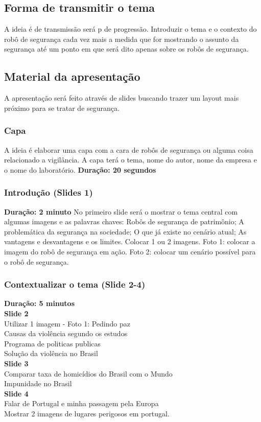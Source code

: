 \documentclass[12pt,a4paper]{article}
\begin{document}
    \subsection{Forma de transmitir o tema}
    A ideia é de transmissão será p de progressão. Introduzir o tema e o contexto do robô de segurança cada vez mais a medida que for mostrando o assunto da segurança até um ponto em que será dito apenas sobre os robôs de segurança. 

    \subsection{Material da apresentação}
    A apresentação será feito através de slides buscando trazer um layout mais próximo para se tratar de segurança.

    \subsubsection{Capa}
    A ideia é elaborar uma capa com a cara de robôs de segurança ou alguma coisa relacionado a vigilância. A capa terá o tema, nome do autor, nome da empresa e o nome do laboratório.
    \textbf{Duração: 20 segundos}

    \subsubsection{Introdução (Slides 1)}
    \textbf{Duração: 2 minuto}
    No primeiro slide será o mostrar o tema central com algumas imagens e as palavras chaves: Robôs de segurança de patrimônio; A problemática da segurança na sociedade;  O que já existe no cenário atual; As vantagens e desvantagens e os limites. Colocar 1 ou 2 imagens. Foto 1: colocar a imagem do robô de segurança em ação. Foto 2: colocar um cenário possível para o robô de segurança.

    \subsubsection{Contextualizar o tema (Slide 2-4)}
    \textbf{Duração: 5 minutos} \\
    \textbf{Slide 2} \\
    Utilizar 1 imagem - Foto 1: Pedindo paz \\
    Causas da violência segundo os estudos \\
    Programa de politicas publicas \\
    Solução da violência no Brasil \\
    \textbf{Slide 3} \\
    Comparar taxa de homicídios do Brasil com o Mundo \\
    Impunidade no Brasil \\
    \textbf{Slide 4} \\
    Falar de Portugal e minha passagem pela Europa \\
    Mostrar 2 imagens de lugares perigosos em portugal. \\
\end{document}
